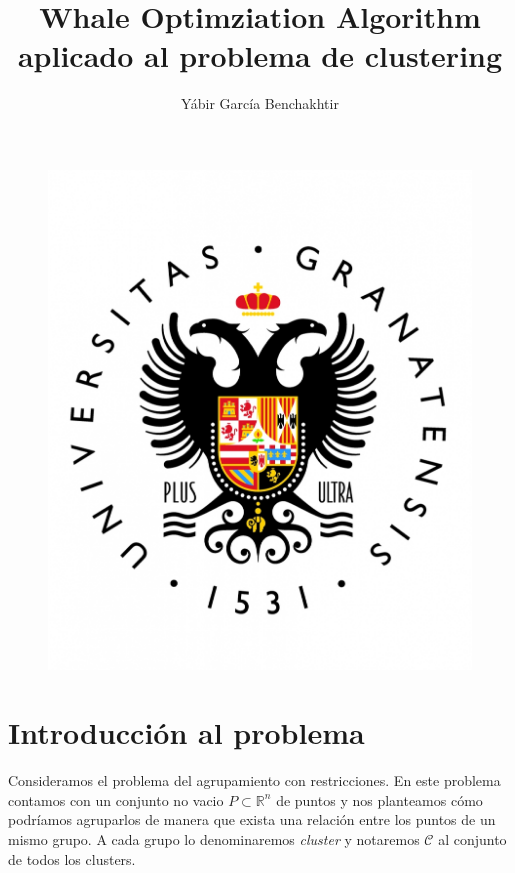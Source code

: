 \documentclass[a4paper,11pt]{article}
\title{Whale Optimziation Algorithm aplicado al problema de clustering}
\author{Yábir García Benchakhtir}
\begin{document}
\maketitle

\begin{figure}[h]
\includegraphics[scale=0.3]{UGR}
\centering
\end{figure}

\newpage

\renewcommand*\contentsname{Índice}
\tableofcontents

\newpage

\section{Introducción al problema}


Consideramos el problema del agrupamiento con restricciones. En este
problema contamos con un conjunto no vacio $P \subset \mathbb{R}^n$ de
puntos y nos planteamos cómo podríamos agruparlos de manera que exista
una relación entre los puntos de un mismo grupo. A cada grupo lo
denominaremos \textit{cluster} y notaremos $\mathcal{C}$ al conjunto
de todos los clusters.
\end{document}
